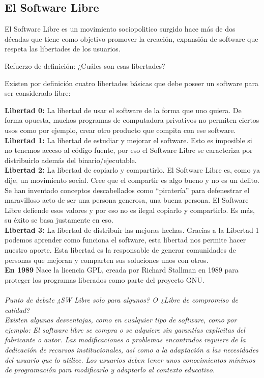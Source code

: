 \documentclass{book}
\begin{document}
\subsection{ El Software Libre}

El Software Libre es un movimiento sociopolitico surgido hace más de dos décadas que tiene como objetivo promover la creación, expansión de software que respeta las libertades de los usuarios.

Refuerzo de definición: ¿Cuáles son esas libertades?

Existen por definición cuatro libertades básicas que debe poseer un software para ser considerado libre:

{\bf Libertad 0:}
La libertad de usar el software de la forma que uno quiera. De forma opuesta, muchos programas de computadora privativos no permiten ciertos usos como por ejemplo, crear otro producto que compita con ese software.
\\
{\bf  Libertad 1:}
La libertad de estudiar y mejorar el software. Esto es imposible si no tenemos acceso al código fuente, por eso el Software Libre se caracteriza por distribuirlo además del binario/ejecutable.
\\
{\bf Libertad 2:}
La libertad de copiarlo y compartirlo. El Software Libre es, como ya dije, un movimiento social. Cree que el compartir es algo bueno y no es un delito. Se han inventado conceptos descabellados como “piratería” para defenestrar el maravilloso acto de ser una persona generosa, una buena persona. El Software Libre defiende esos valores y por eso no es ilegal copiarlo y compartirlo. Es más, su éxito se basa justamente en eso.
\\
{\bf Libertad 3:}
La libertad de distribuir las mejoras hechas. Gracias a la Libertad 1 podemos aprender como funciona el software, esta libertad nos permite hacer nuestro aporte. Esta libertad es la responsable de generar comunidades de personas que mejoran y comparten sus soluciones unos con otros.
\\
{\bf En 1989} Nace la licencia GPL, creada por Richard Stallman en 1989 para proteger los programas liberados como parte del proyecto GNU.
\\
\\
{\it Punto de debate ¿SW Libre solo para algunos? O ¿Libre de compromiso de calidad?
\\
Existen algunas desventajas, como en cualquier tipo de software, como por ejemplo:
El software libre se compra o se adquiere sin garantías explícitas del fabricante o autor.
Las modificaciones o problemas encontrados requiere de la dedicación de recursos institucionales, así como a la adaptación a las necesidades del usuario que lo utilice.
Los usuarios deben tener unos conocimientos mínimos de programación para modificarlo y adaptarlo al contexto educativo.
}
\end{document}
